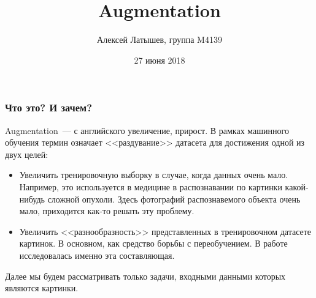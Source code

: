 \documentclass{beamer}
\title[Augmentation]{Augmentation}
\author[А. Латышев]{Алексей Латышев, группа M4139}
\institute[Университет ИТМО]
{
  кафедра Компьютерных технологий\\
  факультет Информационных Технологий и Программирования\\
  Университет ИТМО  
}
\date[ML 2018]{27 июня 2018}
\begin{document}
\begin{frame}
  \titlepage
\end{frame}






\begin{frame}
  \frametitle{Что это? И зачем?}
  Augmentation~--- с английского увеличение, прирост. В рамках машинного
  обучения термин означает <<раздувание>> датасета для достижения одной из двух
  целей:
  \pause
  \begin{itemize}[<+->]
  \item Увеличить тренировочную выборку в случае, когда данных очень мало.
    Например, это используется в медицине в распознавании по картинки
    какой-нибудь сложной опухоли. Здесь фотографий распознавемого объекта очень
    мало, приходится как-то решать эту проблему.
  \item Увеличить <<разнообразность>> представленных в тренировочном датасете
    картинок. В основном, как средство борьбы с переобучением. В работе
    исследовалась именно эта составляющая.
  \end{itemize}
  \pause
  Далее мы будем рассматривать только задачи, входными данными которых являются
  картинки. 
\end{frame}
\end{document}
